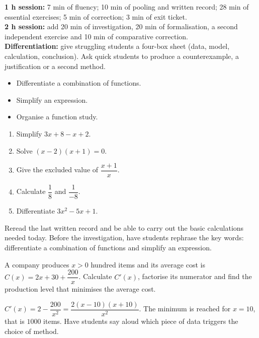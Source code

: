 \ifmxteacher
\begin{method}
\textbf{1 h session:} 7 min of fluency; 10 min of pooling and written record; 28 min of essential exercises; 5 min of correction; 3 min of exit ticket.\\
\textbf{2 h session:} add 20 min of investigation, 20 min of formalisation, a second independent exercise and 10 min of comparative correction.\\
\textbf{Differentiation:} give struggling students a four-box sheet (data, model, calculation, conclusion). Ask quick students to produce a counterexample, a justification or a second method.
\end{method}
\fi
{}
\begin{objectives}\begin{itemize}\item Differentiate a combination of functions.\item Simplify an expression.\item Organise a function study.\end{itemize}\end{objectives}
\begin{fluency}\begin{enumerate}\item Simplify $3x+8-x+2$. \item Solve $(x-2)(x+1)=0$. \item Give the excluded value of $\dfrac{x+1}{x}$. \item Calculate $\dfrac1{8}$ and $\dfrac1{-8}$. \item Differentiate $3x^2-5x+1$. \end{enumerate}\end{fluency}
\begin{prerequisites}Reread the last written record and be able to carry out the basic calculations needed today. Before the investigation, have students rephrase the key words: differentiate a combination of functions and simplify an expression.\end{prerequisites}

\begin{activity}
A company produces $x>0$ hundred items and its average cost is $C(x)=2x+30+\dfrac{200}{x}$. Calculate $C'(x)$, factorise its numerator and find the production level that minimises the average cost.

\end{activity}
\begin{solution}$C'(x)=2-\dfrac{200}{x^2}=\dfrac{2(x-10)(x+10)}{x^2}$. The minimum is reached for $x=10$, that is $\num{1000}$ items. Have students say aloud which piece of data triggers the choice of method.\end{solution}

